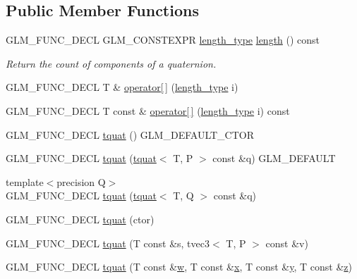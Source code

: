 \subsection*{Public Member Functions}
\begin{DoxyCompactItemize}
\item 
G\+L\+M\+\_\+\+F\+U\+N\+C\+\_\+\+D\+E\+C\+L G\+L\+M\+\_\+\+C\+O\+N\+S\+T\+E\+X\+P\+R \hyperlink{structglm_1_1tquat_ab3ef67a20d129dcb01f042042218ba17}{length\+\_\+type} \hyperlink{structglm_1_1tquat_a1d7ac89221ac08ed9d1e6629da3f612c}{length} () const 
\begin{DoxyCompactList}\small\item\em Return the count of components of a quaternion. \end{DoxyCompactList}\item 
G\+L\+M\+\_\+\+F\+U\+N\+C\+\_\+\+D\+E\+C\+L T \& \hyperlink{structglm_1_1tquat_a7c9434d6e90ddc03ed8b91770765303c}{operator\mbox{[}$\,$\mbox{]}} (\hyperlink{structglm_1_1tquat_ab3ef67a20d129dcb01f042042218ba17}{length\+\_\+type} i)
\item 
G\+L\+M\+\_\+\+F\+U\+N\+C\+\_\+\+D\+E\+C\+L T const \& \hyperlink{structglm_1_1tquat_ab5ad0ee6d7011c024439d5b562834ef5}{operator\mbox{[}$\,$\mbox{]}} (\hyperlink{structglm_1_1tquat_ab3ef67a20d129dcb01f042042218ba17}{length\+\_\+type} i) const 
\item 
G\+L\+M\+\_\+\+F\+U\+N\+C\+\_\+\+D\+E\+C\+L \hyperlink{structglm_1_1tquat_ad9fb7e69b6d17c1a4a670e9634ad4727}{tquat} () G\+L\+M\+\_\+\+D\+E\+F\+A\+U\+L\+T\+\_\+\+C\+T\+O\+R
\item 
G\+L\+M\+\_\+\+F\+U\+N\+C\+\_\+\+D\+E\+C\+L \hyperlink{structglm_1_1tquat_a87826b2d4f6b4492300cd31fc628c68a}{tquat} (\hyperlink{structglm_1_1tquat}{tquat}$<$ T, P $>$ const \&q) G\+L\+M\+\_\+\+D\+E\+F\+A\+U\+L\+T
\item 
{\footnotesize template$<$precision Q$>$ }\\G\+L\+M\+\_\+\+F\+U\+N\+C\+\_\+\+D\+E\+C\+L \hyperlink{structglm_1_1tquat_a85949337d2d2aad95cba4bb469421f78}{tquat} (\hyperlink{structglm_1_1tquat}{tquat}$<$ T, Q $>$ const \&q)
\item 
G\+L\+M\+\_\+\+F\+U\+N\+C\+\_\+\+D\+E\+C\+L \hyperlink{structglm_1_1tquat_a5df316c3914fdeee69ff786cdfbc0ab2}{tquat} (ctor)
\item 
G\+L\+M\+\_\+\+F\+U\+N\+C\+\_\+\+D\+E\+C\+L \hyperlink{structglm_1_1tquat_a93d59b2a1a4e282fc1e103e7ad508448}{tquat} (T const \&s, tvec3$<$ T, P $>$ const \&v)
\item 
G\+L\+M\+\_\+\+F\+U\+N\+C\+\_\+\+D\+E\+C\+L \hyperlink{structglm_1_1tquat_ac130dd4ef34a851301a4bdfb14d0c6b7}{tquat} (T const \&\hyperlink{structglm_1_1tquat_a91055a4c17113bd3f357ffd8595d8ac0}{w}, T const \&\hyperlink{structglm_1_1tquat_a4e7a21e85428fa8d10e613f109185f28}{x}, T const \&\hyperlink{structglm_1_1tquat_a06d5c5fb3b08ec993fb4dd74b22fc011}{y}, T const \&\hyperlink{structglm_1_1tquat_a1b28678ac0e0b3ac2537059754df9fdf}{z})

\end{DoxyCompactItemize}
